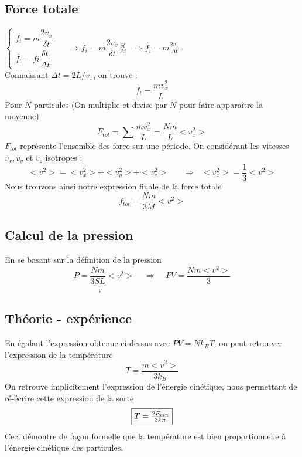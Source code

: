 \documentclass	[11pt, a4paper, openany]{book}
\begin{document}
\subsection{Force totale}
$\left\{\begin{array}{l}
f_i = m\dfrac{2v_x}{\delta t}\\
\overline{f_i} = fi\dfrac{\delta t}{\Delta t}
\end{array}\right.$\ \ \ $\Rightarrow \overline{f_i} = m\dfrac{2v_x}{\delta t}\frac{\delta t}{\Delta t}\ \ \ \Rightarrow \overline{f_i} = m\frac{2v_x}{\Delta t}$\\
Connaissant $\Delta t = 2L/v_x$, on trouve : 
\begin{equation}
\overline{f_i} = \frac{mv_x^2}{L}
\end{equation}
Pour $N$ particules (On multiplie et divise par $N$ pour faire apparaître la moyenne)
\begin{equation}
F_{tot} = \sum \frac{mv_x^2}{L} = \frac{Nm}{L}<v_x^2>
\end{equation}
$F_{tot}$ représente l'ensemble des force sur une période. On considérant les vitesses $v_x, v_y$ et $v_z$ isotropes :
\begin{equation}
<v^2> = <v_x^2> + <v_y^2> + <v_z^2>\ \ \ \ \ \ \ \ \Rightarrow \ \ \ <v_x^2> = \frac{1}{3}<v^2>
\end{equation}
Nous trouvons ainsi notre expression finale de la force totale 
\begin{equation}
f_{tot} = \frac{Nm}{3M}<v^2>
\end{equation}
\subsection{Calcul de la pression}
En se basant sur la définition de la pression
\begin{equation}
P = \frac{Nm}{3\underbrace{SL}_V}<v^2>\ \ \ \ \ \Rightarrow \ \ \ \ \ PV = \frac{Nm<v^2>}{3}
\end{equation}
\subsection{Théorie - expérience}
En égalant l'expression obtenue ci-dessus avec $PV = Nk_BT$, on peut retrouver l'expression de la température
\begin{equation}
T = \frac{m<v^2>}{3k_B}
\end{equation}
On retrouve implicitement l'expression de l'énergie cinétique, nous permettant de ré-écrire cette expression de la sorte
\begin{equation}
\fbox{$ T = \frac{2E_{cin}}{3k_B}$}
\end{equation}
Ceci démontre de façon formelle que la température est bien proportionnelle à l'énergie cinétique des particules.
\end{document}
